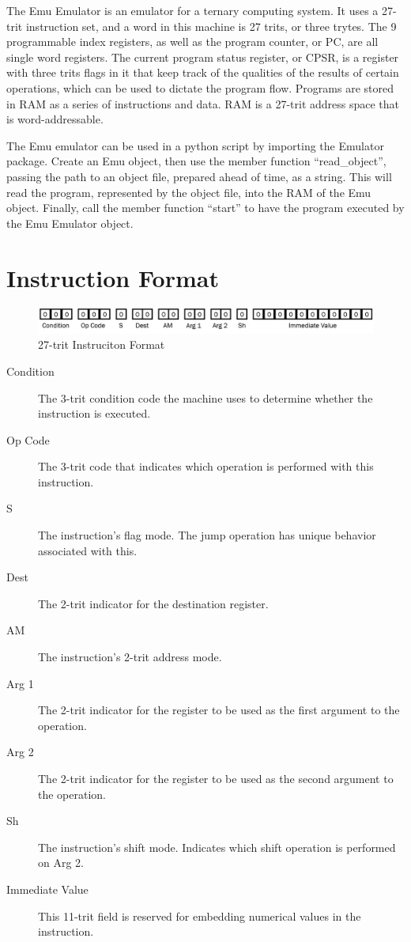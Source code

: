 \documentclass[12pt]{article}
\begin{document}
The Emu Emulator is an emulator for a ternary computing system. It uses a 27-trit instruction
set, and a word in this machine is 27 trits, or three trytes. The 9 programmable index registers,
as well as the program counter, or PC, are all single word registers. The current program status
register, or CPSR, is a register with three trits flags in it that keep track of the qualities of
the results of certain operations, which can be used to dictate the program flow. Programs are
stored in RAM as a series of instructions and data. RAM is a 27-trit address space that is
word-addressable.

The Emu emulator can be used in a python script by importing the Emulator package. Create an Emu
object, then use the member function “read\_object”, passing the path to an object file, prepared
ahead of time, as a string. This will read the program, represented by the object file, into the
RAM of the Emu object. Finally, call the member function “start” to have the program executed by
the Emu Emulator object.

\section{Instruction Format} \label{sec:Format}
               
\begin{figure}[h!]
    \centering
    \includegraphics[width=\linewidth]{Resources/Instruciton_Format.png}
    \caption
    {
        27-trit Instruciton Format
    } \label{fig:Instruction Format}
\end{figure}

\begin{description}
\item[Condition] The 3-trit condition code the machine uses to determine whether the instruction is executed.
\item[Op Code] The 3-trit code that indicates which operation is performed with this instruction.
\item[S] The instruction's flag mode. The jump operation has unique behavior associated with this.
\item[Dest] The 2-trit indicator for the destination register.
\item[AM] The instruction's 2-trit address mode.
\item[Arg 1] The 2-trit indicator for the register to be used as the first argument to the operation.
\item[Arg 2] The 2-trit indicator for the register to be used as the second argument to the operation.
\item[Sh] The instruction's shift mode. Indicates which shift operation is performed on Arg 2.
\item[Immediate Value] This 11-trit field is reserved for embedding numerical values in the instruction.
\end{description}
    
\end{document}
